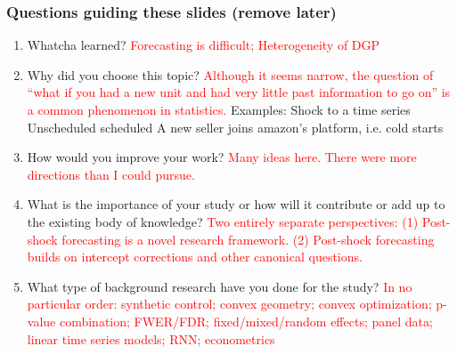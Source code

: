 \documentclass[9pt]{beamer}
\theoremstyle{definition}
\begin{document}
\begin{frame}
    \frametitle{Questions guiding these slides (remove later)}
    \begin{enumerate}
        \item Whatcha learned?
        \textcolor{red}{Forecasting is difficult; Heterogeneity of DGP}
        \item Why did you choose this topic?
        \textcolor{red}{Although it seems narrow, the question of “what if you had a new unit and had very little past information to go on” is a common phenomenon in statistics.}
        Examples:
        Shock to a time series
        Unscheduled
        scheduled
        A new seller joins amazon’s platform, i.e. cold starts \parencite[][]{fatemi2023mitigating}
        \item  How would you improve your work? \textcolor{red}{Many ideas here.  There were more directions than I could pursue.}  

\item  What is the importance of your study or how will it contribute or add up to the existing body of knowledge? \textcolor{red}{Two entirely separate perspectives: (1) Post-shock forecasting is a novel research framework. (2) Post-shock forecasting builds on intercept corrections and other canonical questions.}
\item What type of background research have you done for the study? \textcolor{red}{In no particular order: synthetic control; convex geometry; convex optimization; p-value combination; FWER/FDR; fixed/mixed/random effects; panel data; linear time series models; RNN; econometrics}

    \end{enumerate}
    \end{frame}
\end{document}
